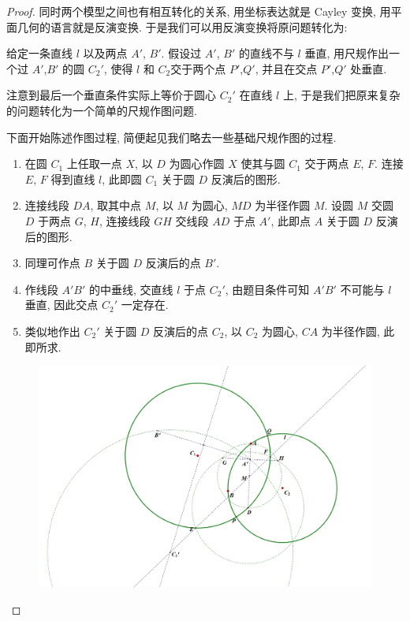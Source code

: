 \begin{proof}
    同时两个模型之间也有相互转化的关系, 用坐标表达就是 Cayley 变换, 用平面几何的语言就是反演变换. 于是我们可以用反演变换将原问题转化为:

    给定一条直线 $l$ 以及两点 $A'$, $B'$. 假设过 $A'$, $B'$ 的直线不与 $l$ 垂直, 用尺规作出一个过 $A'$,$B'$ 的圆 $C_2'$, 使得 $l$ 和 $C_2$交于两个点 $P'$,$Q'$, 并且在交点 $P'$,$Q'$ 处垂直. 
    
    注意到最后一个垂直条件实际上等价于圆心 $C_2'$ 在直线 $l$ 上, 于是我们把原来复杂的问题转化为一个简单的尺规作图问题.

    下面开始陈述作图过程, 简便起见我们略去一些基础尺规作图的过程.
    \begin{enumerate}
        \item 在圆 $C_1$ 上任取一点 $X$, 以 $D$ 为圆心作圆 $X$ 使其与圆 $C_1$ 交于两点 $E$, $F$. 连接 $E$, $F$ 得到直线 $l$, 此即圆 $C_1$ 关于圆 $D$ 反演后的图形.
        \item 连接线段 $DA$, 取其中点 $M$, 以 $M$ 为圆心, $MD$ 为半径作圆 $M$. 设圆 $M$ 交圆 $D$ 于两点 $G$, $H$, 连接线段 $GH$ 交线段 $AD$ 于点 $A'$, 此即点 $A$ 关于圆 $D$ 反演后的图形. 
        \item 同理可作点 $B$ 关于圆 $D$ 反演后的点 $B'$.
        \item 作线段 $A'B'$ 的中垂线, 交直线 $l$ 于点 $C_2'$, 由题目条件可知 $A'B'$ 不可能与 $l$ 垂直, 因此交点 $C_2'$ 一定存在.
        \item 类似地作出 $C_2'$ 关于圆 $D$ 反演后的点 $C_2$, 以 $C_2$ 为圆心, $CA$ 为半径作圆, 此即所求.
    \end{enumerate}
    \begin{figure}[htbp]
        \centering
        \includegraphics[scale = 0.4]{Figures/怀新一题(1).png}
    \end{figure}
\end{proof}
